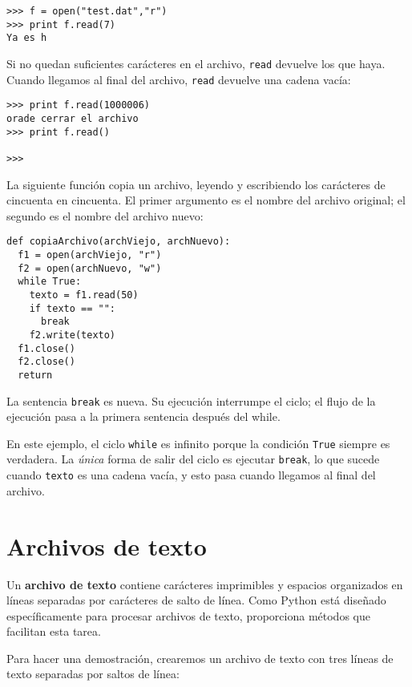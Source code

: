 \beforeverb
\begin{verbatim}
>>> f = open("test.dat","r")
>>> print f.read(7)
Ya es h
\end{verbatim}
\afterverb
%
Si no quedan suficientes carácteres en el archivo, \texttt{read} devuelve los que
haya. Cuando llegamos al final del archivo, \texttt{read} devuelve una cadena vacía:

\beforeverb
\begin{verbatim}
>>> print f.read(1000006)
orade cerrar el archivo
>>> print f.read()

>>>
\end{verbatim}
\afterverb
%
La siguiente función copia un archivo, leyendo y escribiendo los
carácteres de cincuenta en cincuenta. El primer argumento es el
nombre del archivo original; el segundo es el nombre del archivo nuevo:

\beforeverb
\begin{verbatim}
def copiaArchivo(archViejo, archNuevo):
  f1 = open(archViejo, "r")
  f2 = open(archNuevo, "w")
  while True:
    texto = f1.read(50)
    if texto == "":
      break
    f2.write(texto)
  f1.close()
  f2.close()
  return
\end{verbatim}
\afterverb
%
La sentencia \texttt{break} es nueva. Su ejecución interrumpe el
ciclo; el flujo de la ejecución pasa a la primera sentencia después
del while.


En este ejemplo, el ciclo \texttt{while} es infinito porque la condición \texttt{True} 
siempre es verdadera. La {\em única} forma de salir del
ciclo es ejecutar \texttt{break}, lo que sucede cuando \texttt{texto}
es una cadena vacía, y esto pasa cuando llegamos al final del
archivo.



\section{Archivos de texto}

Un {\bf archivo de texto} contiene carácteres imprimibles
y espacios organizados en líneas separadas por carácteres de salto de línea.
Como Python está diseñado específicamente para procesar archivos de texto,
proporciona métodos que facilitan esta tarea.

Para hacer una demostración, crearemos un archivo de texto con tres líneas de texto 
separadas por saltos de línea:


